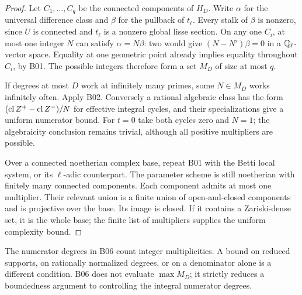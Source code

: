 \begin{proof}
Let $C_1,\ldots,C_q$ be the connected components of $H_D$. Write $\alpha$
for the universal difference class and $\beta$ for the pullback of
$t_\ell$. Every stalk of $\beta$ is nonzero, since $U$ is connected and
$t_\ell$ is a nonzero global lisse section. On any one $C_i$, at most one
integer $N$ can satisfy $\alpha=N\beta$: two would give
$(N-N')\beta=0$ in a $\mathbb Q_\ell$-vector space. Equality at one geometric
point already implies equality throughout $C_i$, by B01. The possible
integers therefore form a set $M_D$ of size at most $q$.

If degrees at most $D$ work at infinitely many primes, some $N\in M_D$
works infinitely often. Apply B02. Conversely a rational algebraic
class has the form $(\operatorname{cl} Z^+-\operatorname{cl} Z^-)/N$ for effective integral cycles,
and their specializations give a uniform numerator bound. For $t=0$
take both cycles zero and $N=1$; the algebraicity conclusion remains
trivial, although all positive multipliers are possible.

Over a connected noetherian complex base, repeat B01 with the Betti
local system, or its $\ell$-adic counterpart. The parameter scheme is
still noetherian with finitely many connected components. Each component
admits at most one multiplier. Their relevant union is a finite union of
open-and-closed components and is projective over the base. Its image is
closed. If it contains a Zariski-dense set, it is the whole base; the finite
list of multipliers supplies the uniform complexity bound.
\end{proof}

\begin{remark}
The numerator degrees in B06 count integer multiplicities. A bound on
reduced supports, on rationally normalized degrees, or on a denominator
alone is a different condition. B06 does not evaluate $\max M_D$; it
strictly reduces a boundedness argument to controlling the integral
numerator degrees.
\end{remark}

